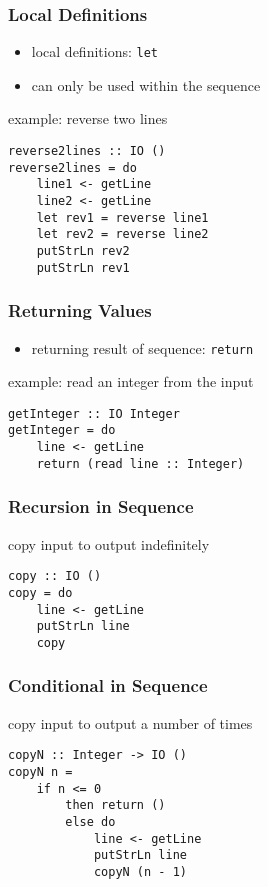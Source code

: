 \documentclass[dvipsnames]{beamer}
\theoremstyle{plain}
\begin{document}
\begin{frame}[fragile]
  \frametitle{Local Definitions}

  \begin{itemize}
    \item local definitions: \lstinline|let|
    \item can only be used within the sequence
  \end{itemize}

  \begin{exampleblock}{example: reverse two lines}
    \begin{lstlisting}
reverse2lines :: IO ()
reverse2lines = do
    line1 <- getLine
    line2 <- getLine
    let rev1 = reverse line1
    let rev2 = reverse line2
    putStrLn rev2
    putStrLn rev1
    \end{lstlisting}
  \end{exampleblock}
\end{frame}

\begin{frame}[fragile]
  \frametitle{Returning Values}

  \begin{itemize}
    \item returning result of sequence: \lstinline|return|
  \end{itemize}

  \begin{exampleblock}{example: read an integer from the input}
    \begin{lstlisting}
getInteger :: IO Integer
getInteger = do
    line <- getLine
    return (read line :: Integer)
    \end{lstlisting}
  \end{exampleblock}
\end{frame}

\begin{frame}[fragile]
  \frametitle{Recursion in Sequence}

  \begin{exampleblock}{copy input to output indefinitely}
    \begin{lstlisting}
copy :: IO ()
copy = do
    line <- getLine
    putStrLn line
    copy
    \end{lstlisting}
  \end{exampleblock}
\end{frame}

\begin{frame}[fragile]
  \frametitle{Conditional in Sequence}

  \begin{exampleblock}{copy input to output a number of times}
    \begin{lstlisting}
copyN :: Integer -> IO ()
copyN n =
    if n <= 0
        then return ()
        else do
            line <- getLine
            putStrLn line
            copyN (n - 1)
    \end{lstlisting}
  \end{exampleblock}
\end{frame}
\end{document}
